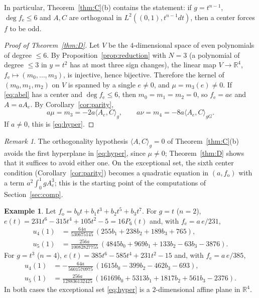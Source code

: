 \documentclass[11pt]{amsart}
\numberwithin{equation}{section}
\theoremstyle{plain}
\theoremstyle{definition}
\newtheorem{example}[theorem]{Example}
\theoremstyle{remark}
\newtheorem{remark}[theorem]{Remark}
\newcommand{\R}{\mathbb{R}}
\newcommand{\fe}{f_{\mathrm e}}
\newcommand{\fo}{f_{\mathrm o}}
\newcommand{\ip}[2]{\langle #1,#2\rangle}
\begin{document}
In particular, Theorem~\ref{thm:C}(b) contains the statement: if $g=t^{n-1}$,
$\deg\fe\le6$ and $A,C$ are orthogonal in $L^2((0,1),t^{n-1}dt)$, then a center
forces $f$ to be odd.

\begin{proof}[Proof of Theorem~\ref{thm:D}]
Let $V$ be the $4$-dimensional space of even polynomials of degree $\le6$. By
Proposition~\ref{prop:reduction} with $N=3$ (a polynomial of degree $\le3$ in
$y=t^2$ has at most three sign changes), the linear map
$V\to\R^4$, $\fe\mapsto(m_0,\dots,m_3)$, is injective, hence bijective. Therefore
the kernel of $(m_0,m_1,m_2)$ on $V$ is spanned by a single $e\ne0$, and
$\mu=m_3(e)\ne0$. If \eqref{eq:abel} has a center and $\deg\fe\le6$, then
$m_0=m_1=m_2=0$, so $\fe=ae$ and $A=aA_e$. By Corollary~\ref{cor:parity},
\[
 a\mu=m_3=-2a\ip{A_e}{C}_g,\qquad a\nu=m_4=-8a\ip{A_e}{C}_{gG}.
\]
If $a\ne0$, this is \eqref{eq:hyper}.
\end{proof}

\begin{remark}
The orthogonality hypothesis $\ip{A}{C}_g=0$ of Theorem~\ref{thm:C}(b) avoids the
first hyperplane in \eqref{eq:hyper}, since $\mu\ne0$; Theorem~\ref{thm:D} shows that
it suffices to avoid either one. On the exceptional set, the sixth center
condition (Corollary~\ref{cor:parity}) becomes a quadratic equation in $(a,\fo)$
with a term $a^2\int_0^1gA_e^3$; this is the starting point of the computations
of Section~\ref{sec:comp}.
\end{remark}

\begin{example}\label{ex:hyper}
Let $\fo=b_0t+b_1t^3+b_2t^5+b_3t^7$. For $g=t$ ($n=2$),
$e(t)=231t^6-315t^4+105t^2-5=16P_6(t)$ and, with $\fe=a\,e/231$,
\begin{align*}
 u_4(1)&=\tfrac{64a}{530675145}\,(255b_1+238b_2+189b_3+765),\\
 u_5(1)&=\tfrac{256a}{10082827755}\,(4845b_0+969b_1+133b_2-63b_3-3876).
\end{align*}
For $g=t^3$ ($n=4$), $e(t)=385t^6-585t^4+231t^2-15$ and, with $\fe=a\,e/385$,
\begin{align*}
 u_4(1)&=-\tfrac{64a}{5601570975}\,(1615b_0-399b_2-462b_3-693),\\
 u_5(1)&=\tfrac{256a}{128836132425}\,(16169b_0+5313b_1+1817b_2+561b_3-2376).
\end{align*}
In both cases the exceptional set \eqref{eq:hyper} is a $2$-dimensional affine
plane in $\R^4$.
\end{example}
\end{document}
